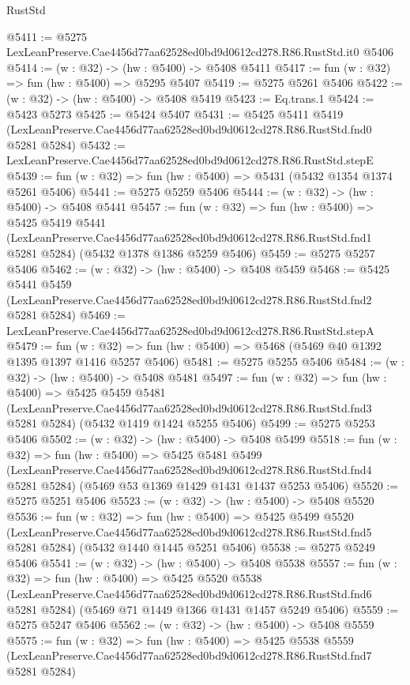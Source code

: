 \begin{lexlean}{RustStd}
\begin{coremodule}
@5411 := @5275 LexLeanPreserve.Cae4456d77aa62528ed0bd9d0612cd278.R86.RustStd.it0 @5406
@5414 := (w : @32) -> (hw : @5400) -> @5408 @5411
@5417 := fun (w : @32) => fun (hw : @5400) => @5295 @5407
@5419 := @5275 @5261 @5406
@5422 := (w : @32) -> (hw : @5400) -> @5408 @5419
@5423 := Eq.trans.{1}
@5424 := @5423 @5273
@5425 := @5424 @5407
@5431 := @5425
    @5411
    @5419
    (LexLeanPreserve.Cae4456d77aa62528ed0bd9d0612cd278.R86.RustStd.fnd0 @5281 @5284)
@5432 := LexLeanPreserve.Cae4456d77aa62528ed0bd9d0612cd278.R86.RustStd.stepE
@5439 := fun (w : @32) => fun (hw : @5400) => @5431 (@5432 @1354 @1374 @5261 @5406)
@5441 := @5275 @5259 @5406
@5444 := (w : @32) -> (hw : @5400) -> @5408 @5441
@5457 := fun (w : @32) =>
  fun (hw : @5400) =>
  @5425
    @5419
    @5441
    (LexLeanPreserve.Cae4456d77aa62528ed0bd9d0612cd278.R86.RustStd.fnd1 @5281 @5284)
    (@5432 @1378 @1386 @5259 @5406)
@5459 := @5275 @5257 @5406
@5462 := (w : @32) -> (hw : @5400) -> @5408 @5459
@5468 := @5425
    @5441
    @5459
    (LexLeanPreserve.Cae4456d77aa62528ed0bd9d0612cd278.R86.RustStd.fnd2 @5281 @5284)
@5469 := LexLeanPreserve.Cae4456d77aa62528ed0bd9d0612cd278.R86.RustStd.stepA
@5479 := fun (w : @32) => fun (hw : @5400) => @5468 (@5469 @40 @1392 @1395 @1397 @1416 @5257 @5406)
@5481 := @5275 @5255 @5406
@5484 := (w : @32) -> (hw : @5400) -> @5408 @5481
@5497 := fun (w : @32) =>
  fun (hw : @5400) =>
  @5425
    @5459
    @5481
    (LexLeanPreserve.Cae4456d77aa62528ed0bd9d0612cd278.R86.RustStd.fnd3 @5281 @5284)
    (@5432 @1419 @1424 @5255 @5406)
@5499 := @5275 @5253 @5406
@5502 := (w : @32) -> (hw : @5400) -> @5408 @5499
@5518 := fun (w : @32) =>
  fun (hw : @5400) =>
  @5425
    @5481
    @5499
    (LexLeanPreserve.Cae4456d77aa62528ed0bd9d0612cd278.R86.RustStd.fnd4 @5281 @5284)
    (@5469 @53 @1369 @1429 @1431 @1437 @5253 @5406)
@5520 := @5275 @5251 @5406
@5523 := (w : @32) -> (hw : @5400) -> @5408 @5520
@5536 := fun (w : @32) =>
  fun (hw : @5400) =>
  @5425
    @5499
    @5520
    (LexLeanPreserve.Cae4456d77aa62528ed0bd9d0612cd278.R86.RustStd.fnd5 @5281 @5284)
    (@5432 @1440 @1445 @5251 @5406)
@5538 := @5275 @5249 @5406
@5541 := (w : @32) -> (hw : @5400) -> @5408 @5538
@5557 := fun (w : @32) =>
  fun (hw : @5400) =>
  @5425
    @5520
    @5538
    (LexLeanPreserve.Cae4456d77aa62528ed0bd9d0612cd278.R86.RustStd.fnd6 @5281 @5284)
    (@5469 @71 @1449 @1366 @1431 @1457 @5249 @5406)
@5559 := @5275 @5247 @5406
@5562 := (w : @32) -> (hw : @5400) -> @5408 @5559
@5575 := fun (w : @32) =>
  fun (hw : @5400) =>
  @5425
    @5538
    @5559
    (LexLeanPreserve.Cae4456d77aa62528ed0bd9d0612cd278.R86.RustStd.fnd7 @5281 @5284)

\end{coremodule}
\end{lexlean}
